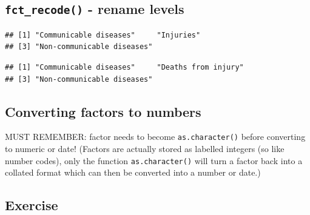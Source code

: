 \documentclass[]{book}
\makeatletter
\newenvironment{Shaded}{\begin{snugshade}}{\end{snugshade}}
\newcommand{\CommentTok}[1]{\textcolor[rgb]{0.56,0.35,0.01}{\textit{#1}}}
\newcommand{\KeywordTok}[1]{\textcolor[rgb]{0.13,0.29,0.53}{\textbf{#1}}}
\newcommand{\NormalTok}[1]{#1}
\newcommand{\OperatorTok}[1]{\textcolor[rgb]{0.81,0.36,0.00}{\textbf{#1}}}
\newcommand{\StringTok}[1]{\textcolor[rgb]{0.31,0.60,0.02}{#1}}
\newenvironment{kframe}{%
\medskip{}
\setlength{\fboxsep}{.8em}
 \def\at@end@of@kframe{}%
 \ifinner\ifhmode%
  \def\at@end@of@kframe{\end{minipage}}%
  \begin{minipage}{\columnwidth}%
 \fi\fi%
 \def\FrameCommand##1{\hskip\@totalleftmargin \hskip-\fboxsep
 \colorbox{shadecolor}{##1}\hskip-\fboxsep
     \hskip-\linewidth \hskip-\@totalleftmargin \hskip\columnwidth}%
 \MakeFramed {\advance\hsize-\width
   \@totalleftmargin\z@ \linewidth\hsize
   \@setminipage}}%
 {\par\unskip\endMakeFramed%
 \at@end@of@kframe}
\renewenvironment{Shaded}{\begin{kframe}}{\end{kframe}}
\theoremstyle{definition}
\theoremstyle{definition}
\theoremstyle{definition}
\theoremstyle{remark}
\makeatother
\begin{document}
\hypertarget{fct_recode---rename-levels}{%
\subsection{\texorpdfstring{\texttt{fct\_recode()} - rename
levels}{fct\_recode() - rename levels}}\label{fct_recode---rename-levels}}

\begin{Shaded}
\end{Shaded}

\begin{verbatim}
## [1] "Communicable diseases"     "Injuries"                 
## [3] "Non-communicable diseases"
\end{verbatim}

\begin{Shaded}
\end{Shaded}

\begin{verbatim}
## [1] "Communicable diseases"     "Deaths from injury"       
## [3] "Non-communicable diseases"
\end{verbatim}

\hypertarget{converting-factors-to-numbers}{%
\subsection{Converting factors to
numbers}\label{converting-factors-to-numbers}}

MUST REMEMBER: factor needs to become \texttt{as.character()} before
converting to numeric or date! (Factors are actually stored as labelled
integers (so like number codes), only the function
\texttt{as.character()} will turn a factor back into a collated format
which can then be converted into a number or date.)

\hypertarget{exercise-17}{%
\subsection{Exercise}\label{exercise-17}}
\end{document}
